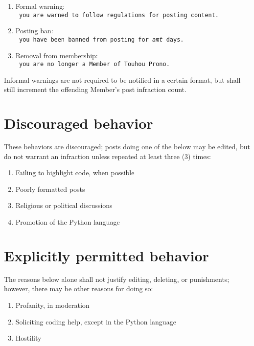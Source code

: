 \documentclass[10pt]{book}
\begin{document}
\begin{enumerate}
 \item Formal warning: \\
 \texttt{
  \nintro you are warned to follow regulations for posting content. \nfinal
 }
 \item Posting ban: \\
 \texttt{
  \nintro you have been banned from posting for \textit{amt} days. \nfinal
 }
 \item Removal from membership: \\
  \texttt{
   \nintro you are no longer a Member of Touhou Prono.
  }
\end{enumerate}

Informal warnings are not required to be notified in a certain format, but shall still increment the offending Member's post infraction count.

\section{Discouraged behavior}
\label{discon}

These behaviors are discouraged; posts doing one of the below may be edited, but do not warrant an infraction unless repeated at least three (3) times:

\begin{enumerate}
 \item Failing to highlight code, when possible
 \item Poorly formatted posts
 \item Religious or political discussions
 \item Promotion of the Python language
\end{enumerate}

\section{Explicitly permitted behavior}
\label{permcon}

The reasons below alone shall not justify editing, deleting, or punishments; however, there may be other reasons for doing so:

\begin{enumerate}
 \item Profanity, in moderation
 \item Soliciting coding help, except in the Python language
 \item Hostility
\end{enumerate}
\end{document}
